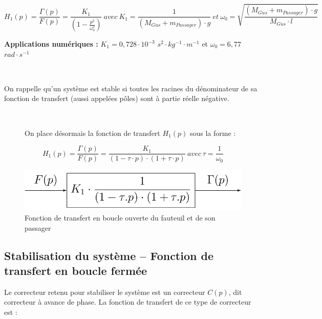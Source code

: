 $$H_1(p) = \frac{\Gamma(p)}{F(p)} = \frac{K_1}{(1-\frac{p^2}{\omega_0^2})}\ avec\ K_1 = \frac{1}{\left(M_{Gus} + m_{Passager}\right) \cdot g}\ et\ \omega_0 = \sqrt{\frac{(M_{Gus} + m_{Passager}) \cdot g}{M_{Gus} \cdot l}}$$

\textbf{Applications numériques :} $K_1 = 0,728 \cdot 10^{-3}$ $s^2 \cdot kg^{-1} \cdot m^{-1}$ et $\omega_0 = 6,77$ $rad \cdot s^{-1}$

~\

On rappelle qu'un système est stable si toutes les racines du dénominateur de sa fonction de transfert (aussi appelées pôles) sont à partie réelle négative.


~\

\begin{figure}[ht!]
\begin{minipage}{0.5\linewidth}
On place désormais la fonction de transfert $H_1(p)$ sous la forme :

$$H_1(p) = \frac{\Gamma(p)}{F(p)} = \frac{K_1}{(1-\tau \cdot p) \cdot (1+\tau \cdot p)}\ avec\ \tau = \frac{1}{\omega_0}$$
\end{minipage}\hfill
\begin{minipage}{0.45\linewidth}
\centering\includegraphics[width=\linewidth]{img/fig18}
\caption{\label{fig18}Fonction de transfert en boucle ouverte du fauteuil et de son passager}
\end{minipage}
\end{figure}

\newpage

\subsection{Stabilisation du système – Fonction de transfert en boucle fermée}

Le correcteur retenu pour stabiliser le système est un correcteur $C(p)$, dit correcteur à avance de
phase. La fonction de transfert de ce type de correcteur est :

